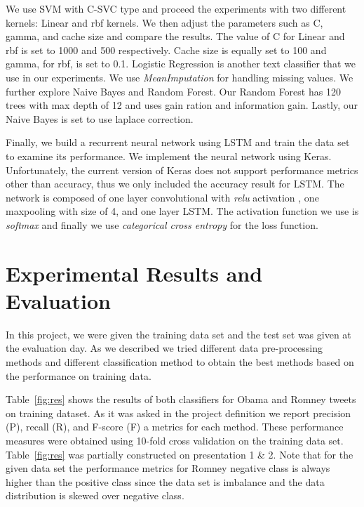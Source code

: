 \documentclass[letterpaper, 12pt]{article}
\begin{document}
We use SVM with C-SVC type and proceed the experiments with two different kernels: Linear and rbf 
kernels. We then adjust the parameters such as C, gamma, and cache size and compare the results. 
The value of C for Linear and rbf is set to 1000 and 500 respectively. Cache size is equally set 
to 100 and gamma, for rbf, is set to 0.1.  Logistic Regression is another text classifier that we use in our experiments. We use \emph{MeanImputation}
for handling missing values. We further explore Naive Bayes and Random Forest. Our Random Forest has 120 trees 
with max depth of 12 and uses gain ration and information gain. Lastly, our Naive Bayes is set to 
use laplace correction. 



Finally, we build a recurrent neural network using LSTM and train the data set to examine its 
performance. We implement the neural network using Keras. Unfortunately, the current version 
of Keras does not support performance metrics other than accuracy, thus we only included the 
accuracy result for LSTM. The network is composed of one layer convolutional with \emph{relu} activation
, one maxpooling with size of 4, and one layer LSTM. The activation function we use 
is \emph{softmax} and finally we use \emph{categorical cross entropy}
for the loss function. 


\section{Experimental Results and Evaluation}

In this project, we were given the training data set and the test set was given at the evaluation day. As we described we tried different data pre-processing methods and different classification method to obtain the best methods based on the performance on training data. 

Table~\ref{fig:res} shows the results of both 
classifiers for Obama and Romney tweets on training dataset.  As it was asked in the project definition we report precision (P), recall (R), and F-score (F) a metrics for each method.  These performance measures were obtained using 10-fold cross validation on the training data set. Table~\ref{fig:res} was partially constructed on presentation 1 \& 2.  Note that for the given data set the performance metrics for Romney negative class is always higher than the positive class since the data set is imbalance and the data distribution is skewed over negative class. 
\end{document}
